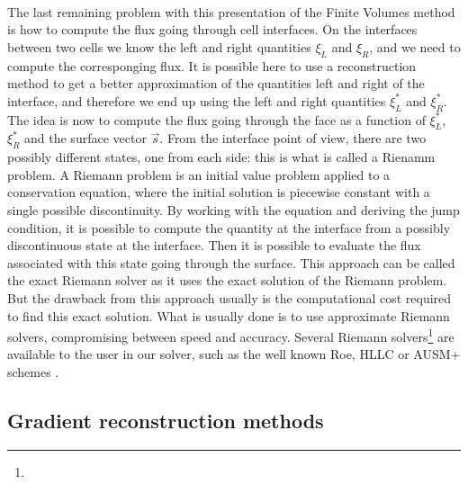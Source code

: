      \paragraph{}
      The last remaining problem with this presentation of the Finite Volumes method is how to compute the flux going through cell interfaces.
      On the interfaces between two cells we know the left and right quantities $\xi_L$ and $\xi_R$, and we need to compute the corresponging flux.
      It is possible here to use a reconstruction method to get a better approximation of the quantities left and right of the interface, and therefore we end up using the left and right quantities $\xi_L^*$ and $\xi_R^*$.
      The idea is now to compute the flux going through the face as a function of $\xi_L^*$, $\xi_R^*$ and the surface vector $\vec{s}$.
      From the interface point of view, there are two possibly different states, one from each side: this is what is called a Rienamm problem.
      A Riemann problem is an initial value problem applied to a conservation equation, where the initial solution is piecewise constant with a single possible discontinuity.
      By working with the equation and deriving the jump condition, it is possible to compute the quantity at the interface from a possibly discontinuous state at the interface.
      Then it is possible to evaluate the flux associated with this state going through the surface.
      This approach can be called the exact Riemann solver as it uses the exact solution of the Riemann problem.
      But the drawback from this approach usually is the computational cost required to find this exact solution.
      What is usually done is to use approximate Riemann solvers, compromising between speed and accuracy.
      Several Riemann solvers\footnote{} are available to the user in our solver, such as the well known Roe, HLLC or AUSM+ schemes \cite{Roe1981, Toro2009}.


    \subsection{Gradient reconstruction methods}

